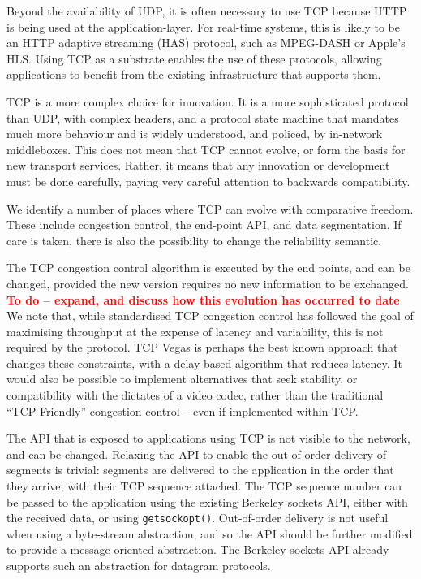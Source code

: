 \documentclass[10pt]{sig-alternate-05-2015}
\newcommand{\todo}[1]{\textbf{\textcolor{red}{To do -- #1}}}
\begin{document}
Beyond the availability of UDP, it is often necessary to use TCP because
HTTP is being used at the application-layer. For real-time systems, this
is likely to be an HTTP adaptive streaming (HAS) protocol, such as
MPEG-DASH or Apple's HLS. Using TCP as a substrate enables the use of these
protocols, allowing applications to benefit from the existing
infrastructure that supports them.

TCP is a more complex choice for innovation. It is a more sophisticated
protocol than UDP, with complex headers, and a protocol state machine
that mandates much more behaviour and is widely understood, and policed,
by in-network middleboxes. This does not mean that TCP cannot evolve, or
form the basis for new transport services. Rather, it means that any
innovation or development must be done carefully, paying very careful
attention to backwards compatibility.

We identify a number of places where TCP can evolve with comparative
freedom. These include congestion control, the end-point API, and data
segmentation. If care is taken, there is also the possibility to change
the reliability semantic.

The TCP congestion control algorithm is executed by the end points, and
can be changed, provided the new version requires no new information to
be exchanged.
\todo{expand, and discuss how this evolution has occurred to date}
We note that, while standardised TCP congestion control has followed the
goal of maximising throughput at the expense of latency and variability,
this is not required by the protocol. TCP Vegas \cite{brakmo:1994:tcp-vegas}
is perhaps the best known approach that changes these constraints, with a
delay-based algorithm that reduces latency. It would also be possible to
implement alternatives that seek stability, or compatibility with the
dictates of a video codec, rather than the traditional ``TCP Friendly''
congestion control -- even if implemented within TCP.

The API that is exposed to applications using TCP is not visible to the
network, and can be changed. Relaxing the API to enable the out-of-order
delivery of segments is trivial: segments are delivered to the application
in the order that they arrive, with their TCP sequence attached. The TCP
sequence number can be passed to the application using the existing
Berkeley sockets API, either with the received data, or using
\texttt{getsockopt()}. Out-of-order delivery is not useful when using a
byte-stream abstraction, and so the API should be further modified to
provide a message-oriented abstraction. The Berkeley sockets API already
supports such an abstraction for datagram protocols.
\end{document}
